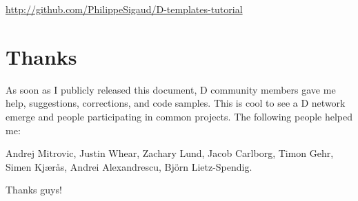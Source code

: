 \vspace{8pt}
\url{http://github.com/PhilippeSigaud/D-templates-tutorial}

\section*{Thanks}\label{thanks}

As soon as I publicly released this document, D community members gave me help, suggestions, corrections, and code samples. This is cool to see a D network emerge and people participating in common projects. The following people helped me:

Andrej Mitrovic, Justin Whear, Zachary Lund, Jacob Carlborg, Timon Gehr, Simen Kj\ae r\r{a}s, Andrei Alexandrescu, Bj\"{o}rn Lietz-Spendig.

\vspace{8pt}
Thanks guys! 
